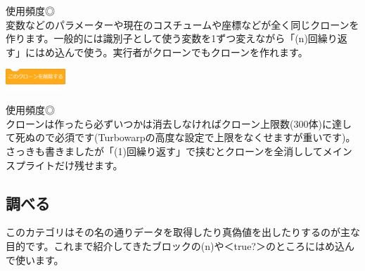 \documentclass[b5paper,10pt]{jsarticle}
\begin{document}
\begin{multicols*}{3}
\begin{itembox}{10}
\end{itembox}
使用頻度◎\\
変数などのパラメーターや現在のコスチュームや座標などが全く同じクローンを作ります。一般的には識別子として使う変数を1ずつ変えながら「(n)回繰り返す」にはめ込んで使う。実行者がクローンでもクローンを作れます。
\begin{itembox}{11}
\includegraphics[height=8mm]{images/control_11.png}
\end{itembox}
使用頻度◎\\
クローンは作ったら必ずいつかは消去しなければクローン上限数(300体)に達して死ぬので必須です(Turbowarpの高度な設定で上限をなくせますが重いです)。さっきも書きましたが「(1)回繰り返す」で挟むとクローンを全消ししてメインスプライトだけ残せます。

\subsection{調べる}
このカテゴリはその名の通りデータを取得したり真偽値を出したりするのが主な目的です。これまで紹介してきたブロックの(n)や＜true?＞のところにはめ込んで使います。


\end{multicols*}
\end{document}
